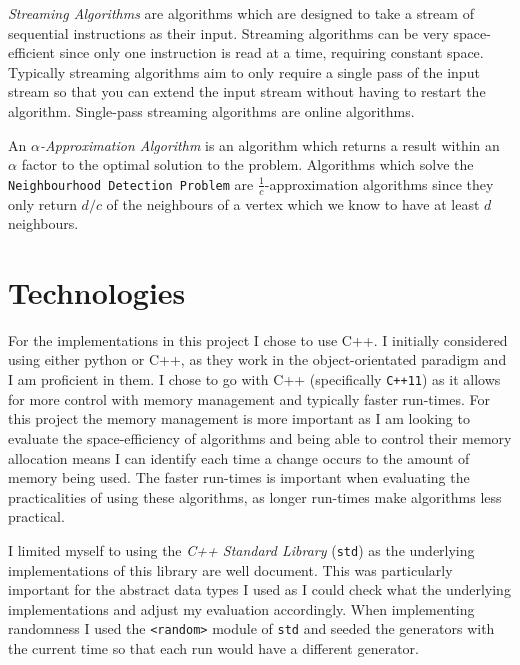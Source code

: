 \documentclass[11pt,twoside,a4paper]{report}
\begin{document}
\par \textit{Streaming Algorithms} are algorithms which are designed to take a stream of sequential instructions as their input. Streaming algorithms can be very space-efficient since only one instruction is read at a time, requiring constant space. Typically streaming algorithms aim to only require a single pass of the input stream so that you can extend the input stream without having to restart the algorithm. Single-pass streaming algorithms are online algorithms. %
\par An \textit{$\alpha$-Approximation Algorithm} is an algorithm which returns a result within an $\alpha$ factor to the optimal solution to the problem. Algorithms which solve the \texttt{Neighbourhood Detection Problem} are $\frac1c$-approximation algorithms since they only return $d/c$ of the neighbours of a vertex which we know to have at least $d$ neighbours.

\section{Technologies}
For the implementations in this project I chose to use C++. I initially considered using either python or C++, as they work in the object-orientated paradigm and I am proficient in them. I chose to go with C++ (specifically \texttt{C++11}) as it allows for more control with memory management and typically faster run-times. For this project the memory management is more important as I am looking to evaluate the space-efficiency of algorithms and being able to control their memory allocation means I can identify each time a change occurs to the amount of memory being used. The faster run-times is important when evaluating the practicalities of using these algorithms, as longer run-times make algorithms less practical.
\par I limited myself to using the \textit{C++ Standard Library} (\texttt{std}) as the underlying implementations of this library are well document. This was particularly important for the abstract data types I used as I could check what the underlying implementations and adjust my evaluation accordingly. When implementing randomness I used the \texttt{<random>} module of \texttt{std} and seeded the generators with the current time so that each run would have a different generator.
\end{document}
